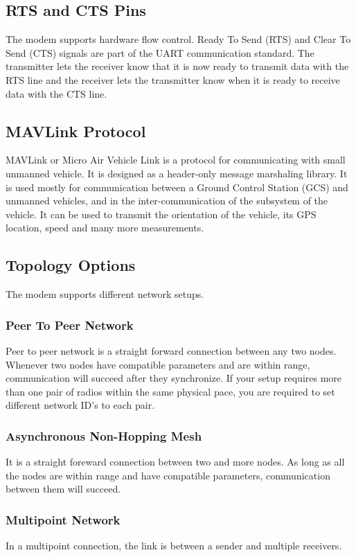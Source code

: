 \subsection{RTS and CTS Pins}
The modem supports hardware flow control. Ready To Send (RTS) and Clear To Send (CTS) signals are part of the UART communication standard. The transmitter lets the receiver know that it is now ready to transmit data with the RTS line and the receiver lets the transmitter know when it is ready to receive data with the CTS line.
%
%
\subsection{MAVLink Protocol}
MAVLink or Micro Air Vehicle Link is a protocol for communicating with small unmanned vehicle. It is designed as a header-only message marshaling library. It is used mostly for communication between a Ground Control Station (GCS) and unmanned vehicles, and in the inter-communication of the subsystem of the vehicle. It can be used to transmit the orientation of the vehicle, its GPS location, speed and many more measurements.

%
%
\subsection{Topology Options}
The modem supports different network setups.
%
\subsubsection{Peer To Peer Network}
Peer to peer network is a straight forward connection between any two nodes. Whenever  two  nodes  have compatible  parameters  and  are within range, communication will succeed after they synchronize. If your setup requires more than one pair of radios within the same physical pace, you are required to set different  network ID’s to each pair. 
%
\subsubsection{Asynchronous Non-Hopping Mesh}
It is a straight foreward connection between two and more nodes. As long as all the nodes are within range and have compatible parameters, communication between them will succeed.
%
\subsubsection{Multipoint Network}
In a multipoint connection, the link is between a sender and multiple receivers. 
%
%
